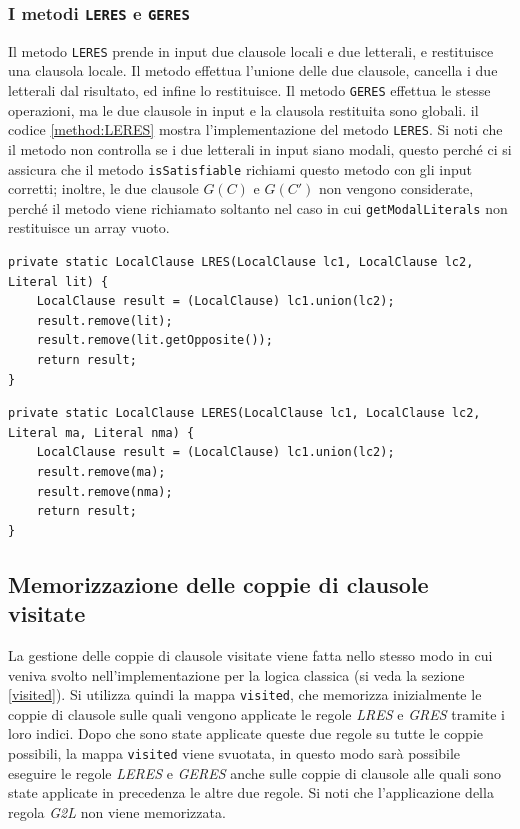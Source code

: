 \documentclass[a4paper,12pt]{report}
\begin{document}
\subsubsection{I metodi \texttt{LERES} e \texttt{GERES}}
Il metodo \texttt{LERES} prende in input due clausole locali e due letterali, e restituisce una clausola locale. Il metodo effettua l'unione delle due clausole, cancella i due letterali dal risultato, ed infine lo restituisce. Il metodo \texttt{GERES} effettua le stesse operazioni, ma le due clausole in input e la clausola restituita sono globali. il codice \ref{method:LERES} mostra l'implementazione del metodo \texttt{LERES}. Si noti che il metodo non controlla se i due letterali in input siano modali, questo perché ci si assicura che il metodo \texttt{isSatisfiable} richiami questo metodo con gli input corretti; inoltre, le due clausole $G(C)$ e $G(C')$ non vengono considerate, perché il metodo viene richiamato soltanto nel caso in cui \texttt{getModalLiterals} non restituisce un array vuoto.

\vspace{20pt}

\begin{minipage}{\linewidth}
    \small
    \begin{lstlisting}[caption={Metodo \texttt{LRES} della classe \texttt{Resolution}}, label={method:LRES}]
private static LocalClause LRES(LocalClause lc1, LocalClause lc2, Literal lit) {
    LocalClause result = (LocalClause) lc1.union(lc2);
    result.remove(lit);
    result.remove(lit.getOpposite());
    return result;
}
    \end{lstlisting}
\end{minipage}

\begin{minipage}{\linewidth}
    \small
    \begin{lstlisting}[caption={Metodo \texttt{LERES} della classe \texttt{Resolution}}, label={method:LERES}]
private static LocalClause LERES(LocalClause lc1, LocalClause lc2, Literal ma, Literal nma) {
    LocalClause result = (LocalClause) lc1.union(lc2);
    result.remove(ma);
    result.remove(nma);
    return result;
}
    \end{lstlisting}
\end{minipage}

\subsection{Memorizzazione delle coppie di clausole visitate}
La gestione delle coppie di clausole visitate viene fatta nello stesso modo in cui veniva svolto nell'implementazione per la logica classica (si veda la sezione \ref{visited}). Si utilizza quindi la mappa \texttt{visited}, che memorizza inizialmente le coppie di clausole sulle quali vengono applicate le regole \emph{LRES} e \emph{GRES} tramite i loro indici. Dopo che sono state applicate queste due regole su tutte le coppie possibili, la mappa \texttt{visited} viene svuotata, in questo modo sarà possibile eseguire le regole \emph{LERES} e \emph{GERES} anche sulle coppie di clausole alle quali sono state applicate in precedenza le altre due regole. Si noti che l'applicazione della regola \emph{G2L} non viene memorizzata.
\end{document}
